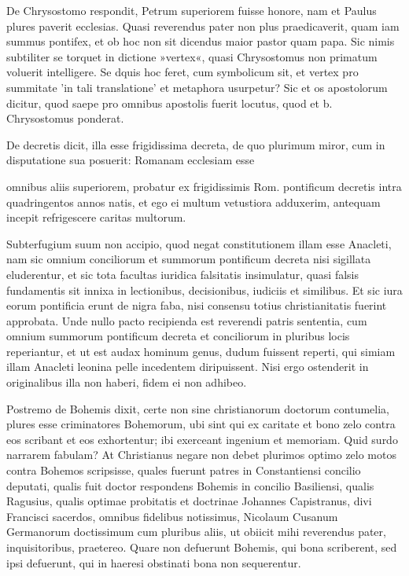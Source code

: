 De Chrysostomo respondit, Petrum superiorem fuisse honore, nam et Paulus plures paverit ecclesias. Quasi reverendus pater non plus praedicaverit, quam iam summus pontifex, et ob hoc non sit dicendus maior pastor quam papa. Sic nimis subtiliter se torquet in dictione »vertex«, quasi Chrysostomus non primatum voluerit intelligere. Se dquis hoc feret, cum symbolicum sit, et vertex pro summitate 'in tali translatione' et metaphora usurpetur? Sic et os apostolorum dicitur, quod saepe pro omnibus apostolis fuerit locutus, quod et b. Chrysostomus ponderat.

De decretis dicit, illa esse frigidissima decreta, de quo plurimum miror, cum in disputatione sua posuerit: Romanam ecclesiam esse

omnibus aliis \marginpar{\small[283]} superiorem, probatur ex frigidissimis Rom. pontificum decretis intra quadringentos annos natis, et ego ei multum vetustiora adduxerim, antequam incepit refrigescere caritas multorum.

Subterfugium suum non accipio, quod negat constitutionem illam esse Anacleti, nam sic omnium conciliorum et summorum pontificum decreta nisi sigillata eluderentur, et sic tota facultas iuridica falsitatis insimulatur, quasi falsis fundamentis sit innixa in lectionibus, decisionibus, iudiciis et similibus. Et sic iura eorum pontificia erunt de nigra faba, nisi consensu totius christianitatis fuerint approbata. Unde nullo pacto recipienda est reverendi patris sententia, cum omnium summorum pontificum decreta et conciliorum in pluribus locis reperiantur, et ut est audax hominum genus, dudum fuissent reperti, qui simiam illam Anacleti leonina pelle incedentem diripuissent. Nisi ergo ostenderit in originalibus illa non haberi, fidem ei non adhibeo.

Postremo de Bohemis dixit, certe non sine christianorum doctorum contumelia, plures esse criminatores Bohemorum, ubi sint qui ex caritate et bono zelo contra eos scribant et eos exhortentur; ibi exerceant ingenium et memoriam. Quid surdo narrarem fabulam? At Christianus negare non debet plurimos optimo zelo motos contra Bohemos scripsisse, quales fuerunt patres in Constantiensi concilio deputati, qualis fuit doctor respondens Bohemis in concilio Basiliensi, qualis Ragusius, qualis optimae probitatis et doctrinae Johannes Capistranus, divi Francisci sacerdos, omnibus fidelibus notissimus, Nicolaum Cusanum Germanorum doctissimum cum pluribus aliis, ut obiicit mihi reverendus pater, inquisitoribus, praetereo. Quare non defuerunt Bohemis, qui bona scriberent, sed ipsi defuerunt, qui in haeresi obstinati bona non sequerentur.

